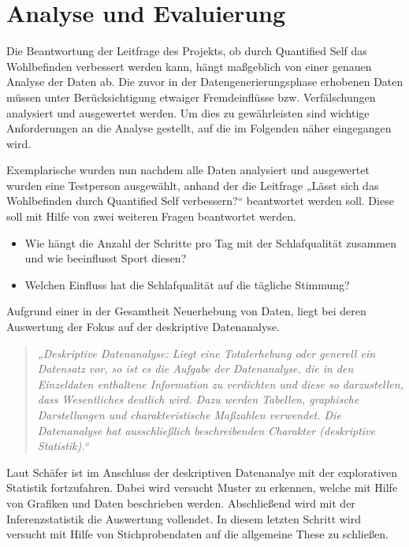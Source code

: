 
\chapter{Analyse und Evaluierung}
\label{ch:AnalyseUndEvaluierung}

Die Beantwortung der Leitfrage des Projekts, ob durch Quantified Self das Wohlbefinden verbessert werden kann, hängt maßgeblich von einer genauen Analyse der Daten ab. 
Die zuvor in der Datengenerierungsphase erhobenen Daten müssen unter Berücksichtigung etwaiger Fremdeinflüsse bzw. Verfälschungen analysiert und ausgewertet werden.
Um dies zu gewährleisten sind wichtige Anforderungen an die Analyse gestellt, auf die im Folgenden näher eingegangen wird.

Exemplarische wurden nun nachdem alle Daten analysiert und ausgewertet wurden eine Testperson ausgewählt, anhand der die Leitfrage „Lässt sich das Wohlbefinden durch Quantified Self verbessern?“ beantwortet werden soll.
Diese soll mit Hilfe von zwei weiteren Fragen beantwortet werden.

\begin{itemize}
	\item Wie hängt die Anzahl der Schritte pro Tag mit der Schlafqualität zusammen und wie beeinflusst Sport diesen? 
	\item Welchen Einfluss hat die Schlafqualität auf die tägliche Stimmung?
\end{itemize}

Aufgrund einer in der Gesamtheit Neuerhebung von Daten, liegt bei deren Auswertung der Fokus auf der deskriptive Datenanalyse.

\begin{quote}
\textit{„Deskriptive Datenanalyse: Liegt eine Totalerhebung oder generell ein Datensatz vor, so ist es die Aufgabe der Datenanalyse, die in den Einzeldaten enthaltene Information zu verdichten und diese so darzustellen, dass Wesentliches deutlich wird. Dazu werden Tabellen, graphische Darstellungen und charakteristische Maßzahlen verwendet.  Die Datenanalyse hat ausschließlich beschreibenden Charakter (deskriptive Statistik).“} 
\end{quote}
\cite[Springer Gabler Wirtschaftslexikon]{web:SpringerDatenanalyse}

Laut Schäfer\cite{Schafer2010} ist im Anschluss der deskriptiven Datenanalye mit der explorativen Statistik fortzufahren.
Dabei wird versucht Muster zu erkennen, welche mit Hilfe von Grafiken und Daten beschrieben werden.
Abschließend wird mit der Inferenzstatistik die Auswertung vollendet.
In diesem letzten Schritt wird versucht mit Hilfe von Stichprobendaten auf die allgemeine These zu schließen.
\\
\\

